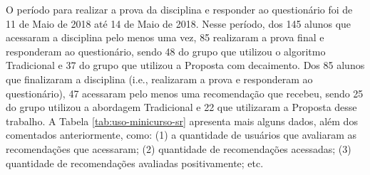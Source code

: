 O período para realizar a prova da disciplina e responder ao questionário foi de 11 de Maio de 2018 até
14 de Maio de 2018. Nesse período, dos 145 alunos que acessaram a disciplina pelo menos uma vez, 85 realizaram a prova final e responderam ao
questionário, sendo 48 do grupo que utilizou o algoritmo Tradicional e 37 do grupo que utilizou a Proposta
com decaimento. Dos 85 alunos que finalizaram a disciplina (i.e., realizaram a prova e responderam ao questionário),
47 acessaram pelo menos uma recomendação que recebeu, sendo 25 do grupo utilizou a abordagem Tradicional e
22 que utilizaram a Proposta desse trabalho. A Tabela \ref{tab:uso-minicurso-sr} apresenta mais alguns dados, além dos
comentados anteriormente, como: (1) a quantidade de usuários que avaliaram as recomendações que acessaram;
(2) quantidade de recomendações acessadas; (3) quantidade de recomendações avaliadas positivamente; etc.


